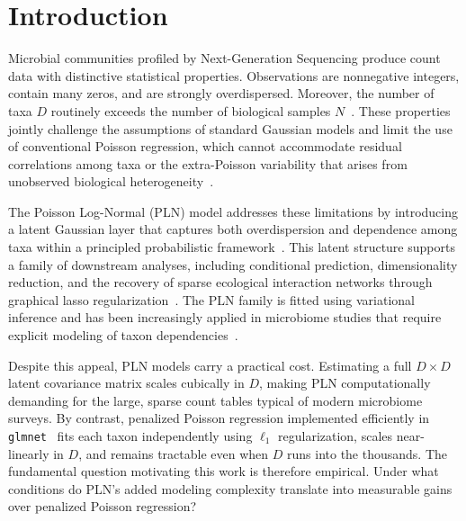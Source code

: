 \documentclass[preprint,review,12pt,authoryear]{elsarticle}
\begin{document}
\section{Introduction}
Microbial communities profiled by Next-Generation Sequencing produce count data with distinctive statistical properties.
Observations are nonnegative integers, contain many zeros, and are strongly overdispersed.   
Moreover, the number of taxa $D$ routinely exceeds the number of biological samples $N$~\citep{Kodikara2022}.
These properties jointly challenge the assumptions of standard Gaussian models and limit the use of conventional Poisson regression, which cannot accommodate residual correlations among taxa or the extra-Poisson variability that arises from unobserved biological heterogeneity~\citep{mcmurdie2014waste, Chiquet2021}.

The Poisson Log-Normal (PLN) model addresses these limitations by introducing a latent Gaussian layer that captures both overdispersion and dependence among taxa within a principled probabilistic framework~\citep{aitchison1989multivariate, Chiquet2021}.
This latent structure supports a family of downstream analyses, including conditional prediction, dimensionality reduction, and the recovery of sparse ecological interaction networks through graphical lasso regularization~\citep{chiquet2019variational}.
The PLN family is fitted using variational inference and has been increasingly applied in microbiome studies that require explicit modeling of taxon dependencies~\citep{Chiquet2021, SUBEDI20251255}.

Despite this appeal, PLN models carry a practical cost.
Estimating a full $D \times D$ latent covariance matrix scales cubically in $D$, making PLN computationally demanding for the large, sparse count tables typical of modern microbiome surveys.
By contrast, penalized Poisson regression implemented efficiently in \texttt{glmnet}~\citep{Friedman2010} fits each taxon independently using $\ell_1$ regularization, scales near-linearly in $D$, and remains tractable even when $D$ runs into the thousands.
The fundamental question motivating this work is therefore empirical.
Under what conditions do PLN's added modeling complexity translate into measurable gains over penalized Poisson regression?
\end{document}
